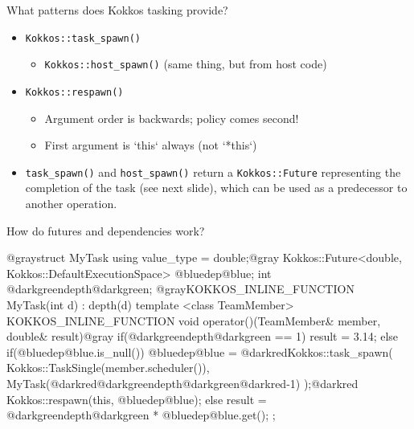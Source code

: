 
\begin{frame}[fragile]{What patterns does Kokkos tasking provide?}

  \begin{itemize}
    \item \texttt{Kokkos::task\_spawn()}
    \begin{itemize}
      \item \texttt{Kokkos::host\_spawn()} (same thing, but from host code)
    \end{itemize}
  \item \texttt{Kokkos::respawn()}
    \begin{itemize}
      \item {\color{red}Argument order is backwards; policy comes second!}
      \item {\color{red}First argument is `this` always (not `*this`)}
    \end{itemize}
  \item \texttt{task\_spawn()} and \texttt{host\_spawn()} return a \texttt{Kokkos::Future} representing the completion of the task (see next slide), which can be used as a predecessor to another operation.
  \end{itemize}

\end{frame}


\begin{frame}[fragile]{How do futures and dependencies work?}

  \begin{code}[linebackgroundcolor={},keywords={}]
@graystruct MyTask {
  using value_type = double;@gray
  Kokkos::Future<double, Kokkos::DefaultExecutionSpace> @bluedep@blue;
  int @darkgreendepth@darkgreen;
  @grayKOKKOS_INLINE_FUNCTION MyTask(int d) : depth(d) { } 
  template <class TeamMember>
  KOKKOS_INLINE_FUNCTION
  void operator()(TeamMember& member, double& result)@gray {
    if(@darkgreendepth@darkgreen == 1) result = 3.14;
    else if(@bluedep@blue.is_null()) {
      @bluedep@blue =
        @darkredKokkos::task_spawn(
          Kokkos::TaskSingle(member.scheduler()),
          MyTask(@darkred@darkgreendepth@darkgreen@darkred-1)
        );@darkred
      Kokkos::respawn(this, @bluedep@blue);
    }
    else {
      result = @darkgreendepth@darkgreen * @bluedep@blue.get();
    }
  }
};
  \end{code}
\end{frame}

